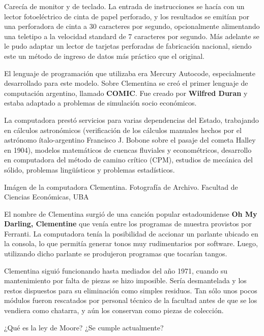 Carecía de monitor y de teclado. La entrada de instrucciones se hacía con un
lector fotoeléctrico de cinta de papel perforado, y los resultados se emitían
por una perforadora de cinta a 30 caracteres por segundo, opcionalmente
alimentando una teletipo a la velocidad standard de 7 caracteres por segundo.
Más adelante se le pudo adaptar un lector de tarjetas perforadas de fabricación
nacional, siendo este un método de ingreso de datos más práctico que el
original.

El lenguaje de programación que utilizaba era Mercury Autocode, especialmente
desarrollado para este modelo. Sobre Clementina se creó el primer lenguaje de
computación argentino, llamado \textbf{COMIC}. Fue creado por \textbf{Wilfred
Duran} y estaba adaptado a problemas de simulación socio económicos.

La computadora prestó servicios para varias dependencias del Estado, trabajando
en cálculos astronómicos (verificación de los cálculos manuales hechos por el
astrónomo ítalo-argentino Francisco J. Bobone sobre el pasaje del cometa Halley
en 1904), modelos matemáticos de cuencas fluviales y econométricos, desarrollo
en computadora del método de camino crítico (CPM), estudios de mecánica del
sólido, problemas lingüísticos y problemas estadísticos.

{Imágen de la computadora Clementina.} {Fotografía de Archivo. Facultad de
Ciencias Económicas, UBA}

El nombre de Clementina surgió de una canción popular estadounidense \textbf{Oh
My Darling, Clementine} que venía entre los programas de muestra provistos por
Ferranti. La computadora tenía la posibilidad de accionar un parlante ubicado en
la consola, lo que permitía generar tonos muy rudimentarios por software. Luego,
utilizando dicho parlante se produjeron programas que tocarían tangos.

Clementina siguió funcionando hasta mediados del año 1971, cuando su
mantenimiento por falta de piezas se hizo imposible. Sería desmantelada y los
restos dispuestos para su eliminación como simples residuos. Tan sólo unos pocos
módulos fueron rescatados por personal técnico de la facultad antes de que se
los vendiera como chatarra, y aún los conservan como piezas de colección.
\vspace{1cm}

\begin{exercise}
¿Qué es la ley de Moore? ¿Se cumple actualmente?
\end{exercise}


